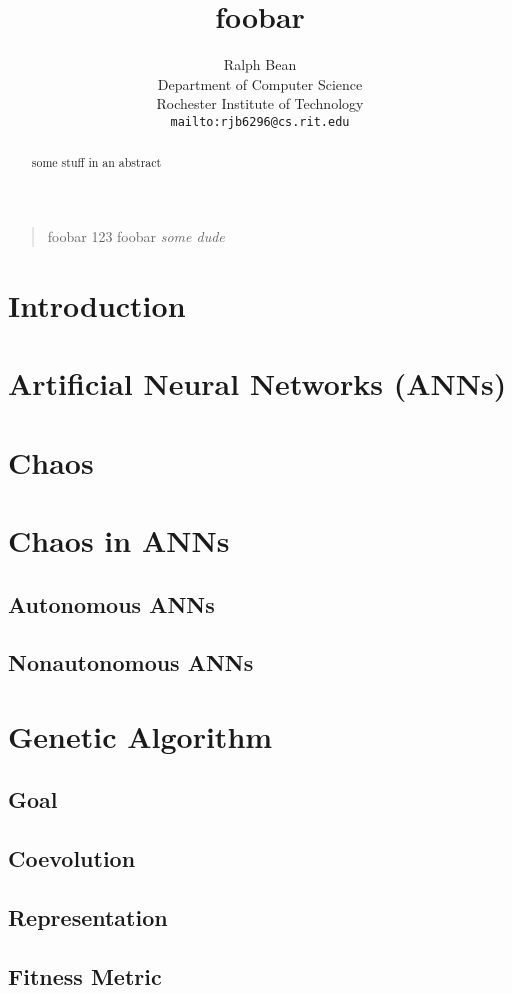 \documentclass[12pt]{article}
\title{foobar}
\author{Ralph Bean\\
Department of Computer Science\\
Rochester Institute of Technology\\
\texttt{mailto:rjb6296@cs.rit.edu}}
\begin{document}
\maketitle

\begin{quote}
foobar 123 foobar
\emph{some dude}
\end{quote}
\begin{abstract}
some stuff in an abstract
\end{abstract}
\newpage
\setcounter{secnumdepth}{3}

\tableofcontents
\newpage

\section{Introduction}
\section{Artificial Neural Networks (ANNs)}
\section{Chaos}
\section{Chaos in ANNs}
\subsection{Autonomous ANNs}
\subsection{Nonautonomous ANNs}
\section{Genetic Algorithm}
\subsection{Goal}
\subsection{Coevolution}
\subsection{Representation}
\subsection{Fitness Metric}
\end{document}
